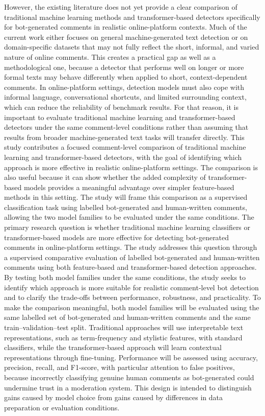 \documentclass[conference]{IEEEtran}
\begin{document}
However, the existing literature does not yet provide a clear comparison of traditional machine learning methods and transformer-based detectors specifically for bot-generated comments in realistic online-platform contexts. Much of the current work either focuses on general machine-generated text detection or on domain-specific datasets that may not fully reflect the short, informal, and varied nature of online comments. This creates a practical gap as well as a methodological one, because a detector that performs well on longer or more formal texts may behave differently when applied to short, context-dependent comments. In online-platform settings, detection models must also cope with informal language, conversational shortcuts, and limited surrounding context, which can reduce the reliability of benchmark results. For that reason, it is important to evaluate traditional machine learning and transformer-based detectors under the same comment-level conditions rather than assuming that results from broader machine-generated text tasks will transfer directly. This study contributes a focused comment-level comparison of traditional machine learning and transformer-based detectors, with the goal of identifying which approach is more effective in realistic online-platform settings. The comparison is also useful because it can show whether the added complexity of transformer-based models provides a meaningful advantage over simpler feature-based methods in this setting. The study will frame this comparison as a supervised classification task using labelled bot-generated and human-written comments, allowing the two model families to be evaluated under the same conditions.
The primary research question is whether traditional machine learning classifiers or transformer-based models are more effective for detecting bot-generated comments in online-platform settings. The study addresses this question through a supervised comparative evaluation of labelled bot-generated and human-written comments using both feature-based and transformer-based detection approaches. By testing both model families under the same conditions, the study seeks to identify which approach is more suitable for realistic comment-level bot detection and to clarify the trade-offs between performance, robustness, and practicality.
To make the comparison meaningful, both model families will be evaluated using the same labelled set of bot-generated and human-written comments and the same train--validation--test split. Traditional approaches will use interpretable text representations, such as term-frequency and stylistic features, with standard classifiers, while the transformer-based approach will learn contextual representations through fine-tuning. Performance will be assessed using accuracy, precision, recall, and F1-score, with particular attention to false positives, because incorrectly classifying genuine human comments as bot-generated could undermine trust in a moderation system. This design is intended to distinguish gains caused by model choice from gains caused by differences in data preparation or evaluation conditions.
\end{document}
